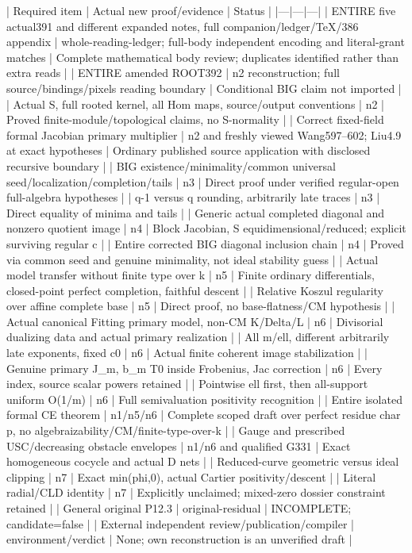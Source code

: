 \documentclass[11pt]{article}
\begin{document}
| Required item | Actual new proof/evidence | Status |
|---|---|---|
| ENTIRE five actual391 and different expanded notes, full companion/ledger/TeX/386 appendix | whole-reading-ledger; full-body independent encoding and literal-grant matches | Complete mathematical body review; duplicates identified rather than extra reads |
| ENTIRE amended ROOT392 | n2 reconstruction; full source/bindings/pixels reading boundary | Conditional BIG claim not imported |
| Actual S, full rooted kernel, all Hom maps, source/output conventions | n2 | Proved finite-module/topological claims, no S-normality |
| Correct fixed-field formal Jacobian primary multiplier | n2 and freshly viewed Wang597--602; Liu4.9 at exact hypotheses | Ordinary published source application with disclosed recursive boundary |
| BIG existence/minimality/common universal seed/localization/completion/tails | n3 | Direct proof under verified regular-open full-algebra hypotheses |
| q-1 versus q rounding, arbitrarily late traces | n3 | Direct equality of minima and tails |
| Generic actual completed diagonal and nonzero quotient image | n4 | Block Jacobian, S equidimensional/reduced; explicit surviving regular c |
| Entire corrected BIG diagonal inclusion chain | n4 | Proved via common seed and genuine minimality, not ideal stability guess |
| Actual model transfer without finite type over k | n5 | Finite ordinary differentials, closed-point perfect completion, faithful descent |
| Relative Koszul regularity over affine complete base | n5 | Direct proof, no base-flatness/CM hypothesis |
| Actual canonical Fitting primary model, non-CM K/Delta/L | n6 | Divisorial dualizing data and actual primary realization |
| All m/ell, different arbitrarily late exponents, fixed c0 | n6 | Actual finite coherent image stabilization |
| Genuine primary J\_m, b\_m T0 inside Frobenius, Jac correction | n6 | Every index, source scalar powers retained |
| Pointwise ell first, then all-support uniform O(1/m) | n6 | Full semivaluation positivity recognition |
| Entire isolated formal CE theorem | n1/n5/n6 | Complete scoped draft over perfect residue char p, no algebraizability/CM/finite-type-over-k |
| Gauge and prescribed USC/decreasing obstacle envelopes | n1/n6 and qualified G331 | Exact homogeneous cocycle and actual D nets |
| Reduced-curve geometric versus ideal clipping | n7 | Exact min(phi,0), actual Cartier positivity/descent |
| Literal radial/CLD identity | n7 | Explicitly unclaimed; mixed-zero dossier constraint retained |
| General original P12.3 | original-residual | INCOMPLETE; candidate=false |
| External independent review/publication/compiler | environment/verdict | None; own reconstruction is an unverified draft |
\end{document}
